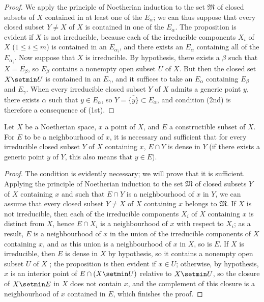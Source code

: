 \begin{proof}
We apply the principle of Noetherian induction  to the set $\mathfrak{M}$ of closed subsets of $X$ contained in at least one of the $E_\alpha$; we can thus suppose that every closed subset $Y\neq X$ of $X$ is contained in one of the $E_\alpha$.
The proposition is evident if $X$ is not irreducible, because each of the irreducible components $X_i$ of $X$ ($1\leq i\leq m$) is contained in an $E_{\alpha_i}$, and there exists an $E_\alpha$ containing all of the $E_{\alpha_i}$.
Now suppose that $X$ is irreducible.
By hypothesis, there exists a $\beta$ such that $X=\overline{E_\beta}$, so  $E_\beta$ contains a nonempty open subset $U$ of $X$.
But then the closed set $X\setmin U$ is contained in an $E_\gamma$, and it suffices to take an $E_\alpha$ containing $E_\beta$ and $E_\gamma$.
When every irreducible closed subset $Y$ of $X$
admits a generic point $y$, there exists $\alpha$ such that $y\in E_\alpha$, so $Y=\overline{\{y\}}\subset\overline{E_\alpha}$, and condition (2nd) is therefore a consequence of (1st).
\end{proof}

\begin{proposition}[9.2.5]
\label{0.9.2.5}
Let $X$ be a Noetherian space, $x$ a point of $X$, and $E$ a constructible subset of $X$.
For $E$ to be a neighbourhood of $x$, it is necessary and sufficient that for every irreducible closed subset $Y$ of $X$ containing $x$, $E\cap Y$ is dense in $Y$ (if there exists a generic point $y$ of $Y$, this also means  that $y\in E$).
\end{proposition}

\begin{proof}
The condition is evidently necessary; we will prove that it is sufficient.
Applying the principle of Noetherian induction to the set $\mathfrak{M}$ of closed subsets $Y$ of $X$ containing $x$ and such that $E\cap Y$ is a neighbourhood of $x$ in $Y$, we can assume that every closed subset $Y\neq X$ of $X$ containing $x$ belongs to $\mathfrak{M}$.
If $X$ is not irreducible, then each of the irreducible components $X_i$ of $X$ containing $x$ is distinct from $X$, hence $E\cap X_i$ is a neighbourhood of $x$ with respect to $X_i$; as a result, $E$ is a neighbourhood of $x$ in the union of the irreducible components of $X$ containing $x$, and as this union is a neighbourhood of $x$ in $X$, so is $E$.
If $X$ is irreducible, then $E$ is dense in $X$ by hypothesis, so it contains a nonempty open subset $U$ of $X$ ; the proposition is then evident if $x\in U$; otherwise, by hypothesis, $x$ is an interior point of $E\cap(X\setmin U)$ relative to $X\setmin U$, so the closure of $X\setmin E$ in $X$ does not contain $x$, and the complement of this closure is a neighbourhood of $x$ contained in $E$, which finishes the proof.
\end{proof}

